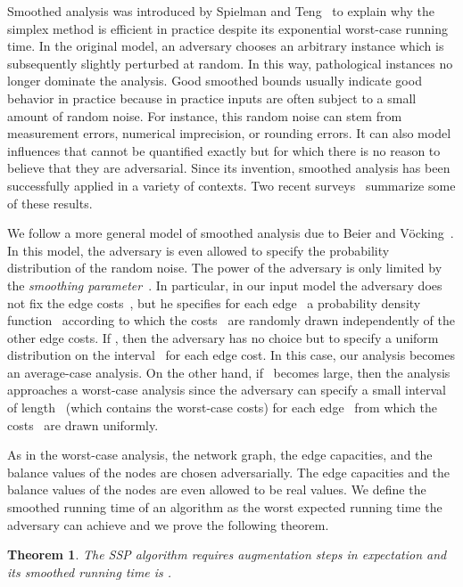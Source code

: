 \documentclass[11pt]{article}
\newtheorem{theorem}{Theorem}
\begin{document}
Smoothed analysis was introduced by Spielman and Teng~\cite{DBLP:journals/jacm/SpielmanT04} to explain why the simplex method is efficient in practice despite its exponential worst-case running time. In the original model, an adversary chooses an arbitrary instance which is subsequently slightly perturbed at random. In this way, pathological instances no longer dominate the analysis. Good smoothed bounds usually indicate good behavior in practice because in practice inputs are often subject to a small amount of random noise. For
instance, this random noise can stem from measurement errors, numerical imprecision, or rounding errors. It can also model influences that cannot be quantified exactly but for which there is no reason to believe that they are adversarial. Since its invention, smoothed analysis has been successfully applied in a variety of contexts. Two recent surveys~\cite{MR,SpielmanT09} summarize some of these results.

We follow a more general model of smoothed analysis due to Beier and V{\"o}cking~\cite{BeierV04}. In this model, the adversary is even
allowed to specify the probability distribution of the random noise. The power of the adversary is only limited by the \emph{smoothing
parameter}~. In particular, in our input model the adversary does not fix the edge costs~, but he
specifies for each edge~ a probability density function~ according to which the costs~ are randomly
drawn independently of the other edge costs. If , then the adversary has no choice but to specify a uniform distribution on the
interval~ for each edge cost. In this case, our analysis becomes an average-case analysis. On the other hand, if~ becomes
large, then the analysis approaches a worst-case analysis since the adversary can specify a small interval~ of length~ (which
contains the worst-case costs) for each edge~ from which the costs~ are drawn uniformly.

As in the worst-case analysis, the network graph, the edge capacities, and the balance values of the nodes are chosen adversarially. The edge capacities and the balance values of the nodes are even allowed to be real values.
We define the smoothed running time of an algorithm as the worst expected running time the adversary can achieve and we prove the following theorem.

\begin{theorem}
\label{maintheorem}
The SSP algorithm requires  augmentation steps in expectation and its smoothed running time is .
\end{theorem}
\end{document}

